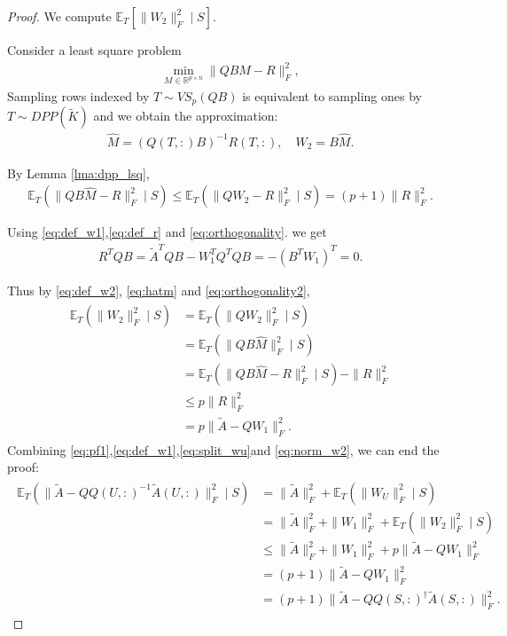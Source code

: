 \documentclass[11pt]{article}
\newcommand{\be}{\begin{eqnarray}}
\newcommand{\ee}{\end{eqnarray}}
\newcommand{\R}{\mathbb{R}}
\newcommand{\<}{\langle}
\renewcommand{\>}{\rangle}
\begin{document}
\begin{proof}
We compute $\mathbb{E}_T[\|W_2\|_F^2 \mid S]$.

Consider a least square problem
\be
\min\limits_{M\in \R^{p\times n}} \|Q B M - R\|_F^2,
\ee
Sampling rows indexed by $T\sim VS_p(QB)$ is equivalent to sampling ones by $T\sim DPP(\widetilde K)$ and we obtain the approximation:
\be
\label{eq:hatm}
\hat M = (Q(T,:)B)^{-1} R(T,:), \quad W_2 = B \hat M.
\ee

By Lemma \ref{lma:dpp_lsq}, 
\be
\label{eq:condexp_w2}
\mathbb{E}_T\!\left( \|Q B \widehat M - R\|_F^2 \mid S \right) \leq \mathbb{E}_T\!\left( \|Q W_2 - R\|_F^2 \mid S \right)
= (p+1)\|R\|_F^2.
\ee

Using \eqref{eq:def_w1},\eqref{eq:def_r} and \eqref{eq:orthogonality}. we get
\be
\label{eq:orthogonality2}
R^T Q B = \widetilde A^T Q B - W_1^T Q^T Q B = -(B^T W_1)^T = 0.
\ee

Thus by \eqref{eq:def_w2}, \eqref{eq:hatm} and \eqref{eq:orthogonality2},
\be \label{eq:norm_w2}
\begin{aligned}
\mathbb{E}_T(\|W_2\|_F^2 \mid S) &= \mathbb{E}_T(\|QW_2\|_F^2 \mid S)\\
&=\mathbb{E}_T(\|QB\widehat M\|_F^2 \mid S)\\
&=\mathbb{E}_T(\|QB\widehat M - R\|_F^2 \mid S) - \|R\|_F^2\\
&\leq p\|R\|_F^2\\
&= p\|\widetilde A -QW_1\|_F^2.
\end{aligned}
\ee
Combining \eqref{eq:pf1},\eqref{eq:def_w1},\eqref{eq:split_wu}and \eqref{eq:norm_w2}, we can end the proof:
\be
\begin{aligned}
    \mathbb{E}_T(\| \widetilde A - Q Q(U,:)^{-1} \widetilde A(U,:) \|_F^2\mid S) &= \|\widetilde A\|_F^2 + \mathbb{E}_T(\| W_U\|_F^2\mid S)\\
   &=\|\widetilde A\|_F^2 + \| W_1\|_F^2 + \mathbb{E}_T(\| W_2\|_F^2\mid S) \\
   & \leq \|\widetilde A\|_F^2 + \| W_1\|_F^2 + p\|\widetilde A -QW_1\|_F^2\\
   & = (p+1)\|\widetilde A -QW_1\|_F^2\\
   & = (p+1)\|\widetilde A -QQ(S,:)^\dagger \widetilde A(S,:)\|_F^2.
\end{aligned}
\ee
\end{proof}
\end{document}
